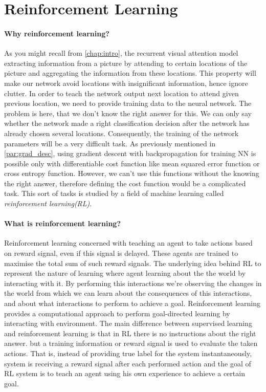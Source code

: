 
\section{Reinforcement Learning}
\paragraph{Why reinforcement learning?}
As you might recall from \autoref{chap:intro}, the recurrent visual attention model
extracting information from a picture by attending to certain locations of the picture
and aggregating the information from these locations. This property will make our network
avoid locations with insignificant information, hence ignore clutter. In order to teach the network
output next location to attend given previous location, we need to provide training data to
the neural network. The problem is here, that we don't know the right answer for this.
We can only say whether the network made a right classification decision after the network
has already chosen several locations. Consequently, the training of the network parameters will
be a very difficult task. As previously mentioned in \autoref{par:grad_desc}, using gradient descent
with backpropagation for training NN is possible only with differentiable cost function like
mean squared error function or cross entropy function. However, we can't use this functions without
the knowing the right answer, therefore defining the cost function would be a complicated task.
This sort of tasks is studied by a field of machine learning called \emph{reinforcement
learning(RL)}.

\paragraph{What is reinforcement learning?}
Reinforcement learning concerned with teaching an agent to take actions based on
reward signal, even if this signal is delayed.
These agents are trained to maximise the total
sum of such reward signals.
The underlying idea behind RL to
represent the nature of learning where agent learning about the the world by interacting
with it. By performing this interactions we're observing the changes in the world
from which we can learn about the consequences of this
interactions, and about what interactions to perform to achieve a goal.
Reinforcement learning provides a computational approach to perform goal-directed learning
by interacting with environment. The main difference between supervised learning and
reinforcement learning is that in RL there is no instructions about the right answer.
but a training information or reward signal is used to evaluate the taken actions.
That is, instead of providing true label for the system instantaneously,
system is receiving a reward signal
after each performed action and the goal of RL system is to teach an agent using his own
experience to achieve a certain goal.

